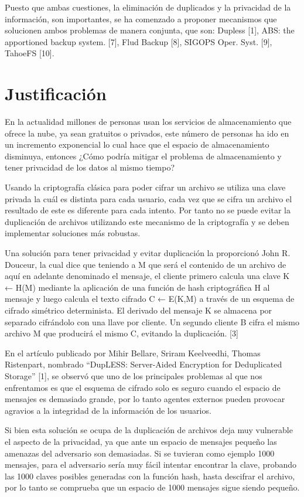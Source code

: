 Puesto que ambas cuestiones, la eliminación de duplicados y la privacidad de la información, son importantes, se ha comenzado a
proponer mecanismos que solucionen ambos problemas de manera conjunta, que son: Dupless [1], ABS: the apportioned backup
system. [7], Flud Backup [8], SIGOPS Oper. Syst. [9], TahoeFS [10].


\section{Justificación}

En la actualidad millones de personas usan los servicios de almacenamiento que ofrece la nube, ya sean gratuitos o privados, este número de personas ha ido en un incremento exponencial lo cual hace que el espacio de almacenamiento disminuya, entonces ¿Cómo podría mitigar el problema de almacenamiento y tener privacidad de los datos al mismo tiempo?

Usando la criptografía clásica para poder cifrar un archivo se utiliza una clave privada la cuál es distinta para cada usuario, cada vez que se cifra un archivo el resultado de este es diferente para cada intento. Por tanto no se puede evitar la duplicación de archivos utilizando este mecanismo de la criptografía y se deben implementar soluciones más robustas.

Una solución para tener privacidad y evitar duplicación la proporcionó John R. Douceur, la cual dice que teniendo a M que será el contenido de un archivo de aquí en adelante denominado el mensaje, el cliente primero calcula una clave K ← H(M) mediante la aplicación de una función de hash criptográfica H al mensaje y luego calcula el texto cifrado C ← E(K,M) a través de un esquema de cifrado simétrico determinista. El derivado del mensaje K se almacena por separado cifrándolo con una llave por cliente. Un segundo cliente B cifra el mismo archivo M que producirá el mismo C, evitando la duplicación. [3]

En el artículo publicado por Mihir Bellare, Sriram Keelveedhi, Thomas Ristenpart, nombrado “DupLESS: Server-Aided Encryption for Deduplicated Storage” [1], se observó que uno de los principales problemas al que nos enfrentamos es que el esquema de cifrado solo es seguro cuando el espacio de mensajes es demasiado grande, por lo tanto agentes externos pueden provocar agravios a la integridad de la información de los usuarios.

Si bien esta solución se ocupa de la duplicación de archivos deja muy vulnerable el aspecto de la privacidad, ya que ante un espacio de mensajes pequeño las amenazas del adversario son demasiadas. Si se tuvieran como ejemplo 1000 mensajes, para el adversario sería muy fácil intentar encontrar la clave, probando las 1000 claves posibles generadas con la función hash, hasta descifrar el archivo, por lo tanto se comprueba que un espacio de 1000 mensajes sigue siendo pequeño.

